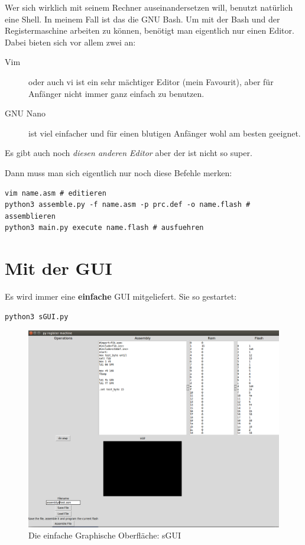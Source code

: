 \documentclass[a4paper,12pt,oneside]{scrreprt}
\begin{document}
Wer sich wirklich mit seinem Rechner auseinandersetzen will, benutzt natürlich eine Shell. In meinem Fall ist das die GNU Bash.  
Um mit der Bash und der Registermaschine arbeiten zu können, benötigt man eigentlich nur einen Editor. Dabei bieten sich vor allem zwei an:

\begin{description}

\item[Vim] oder auch vi ist ein sehr mächtiger Editor (mein Favourit), aber für Anfänger nicht immer ganz einfach zu benutzen.

\item[GNU Nano] ist viel einfacher und für einen blutigen Anfänger wohl am besten geeignet.

\end{description}

Es gibt auch noch \textit{diesen anderen Editor} aber der ist nicht so super.

Dann muss man sich eigentlich nur noch diese Befehle merken:

\begin{lstlisting}
vim name.asm # editieren
python3 assemble.py -f name.asm -p prc.def -o name.flash # assemblieren
python3 main.py execute name.flash # ausfuehren
\end{lstlisting}

\section{Mit der GUI}

Es wird immer eine \textbf{einfache} GUI mitgeliefert.
Sie so gestartet:

\begin{lstlisting}
python3 sGUI.py
\end{lstlisting}

\begin{figure}
\centering
\includegraphics[width=\linewidth]{py_register_machine_sgui.png}
\caption[Graphische Oberfläche sGUI]{Die einfache Graphische Oberfläche: sGUI}
\label{fig:sgui}
\end{figure}
\end{document}
